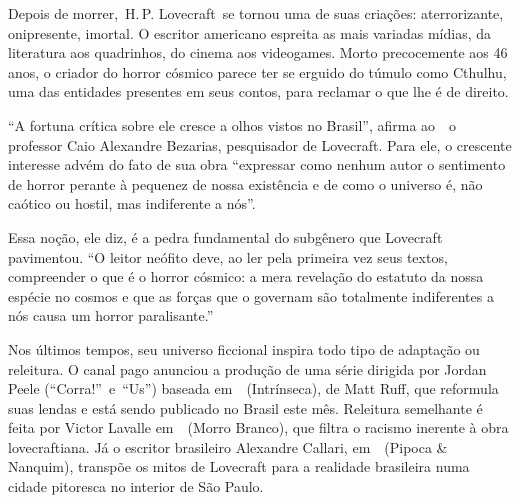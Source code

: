 \begin{changemargin}
\hspace{.5cm}
\vspace*{1cm}
\enlargethispage{-\baselineskip}


\medskip

\hfill{}

\bigskip

Depois de morrer, H.\,P. Lovecraft se tornou uma de suas criações: aterrorizante, onipresente, imortal. O escritor americano espreita as mais variadas mídias, da literatura aos quadrinhos, do cinema aos videogames. Morto precocemente aos 46 anos, o criador do horror cósmico parece ter se erguido do túmulo como Cthulhu, uma das entidades presentes em seus contos, para reclamar o que lhe é de direito.

“A fortuna crítica sobre ele cresce a olhos vistos no Brasil”, afirma ao {} o professor Caio Alexandre Bezarias, pesquisador de Lovecraft. Para ele, o crescente interesse advém do fato de sua obra “expressar como nenhum autor o sentimento de horror perante à pequenez de nossa existência e de como o universo é, não caótico ou hostil, mas indiferente a nós”. 

Essa noção, ele diz, é a pedra fundamental do subgênero que Lovecraft pavimentou. “O leitor neófito deve, ao ler pela primeira vez seus textos, compreender o que é o horror cósmico: a mera revelação do estatuto da nossa espécie no cosmos e que as forças que o governam são totalmente indiferentes a nós causa um horror paralisante.”

Nos últimos tempos, seu universo ficcional inspira todo tipo de adaptação ou releitura. O canal pago  anunciou a produção de uma série dirigida por Jordan Peele (“Corra!” e “Us”) baseada em {} (Intrínseca), de Matt Ruff, que reformula suas lendas e está sendo publicado no Brasil este mês. Releitura semelhante é feita por Victor Lavalle em {} (Morro Branco), que filtra o racismo inerente à obra lovecraftiana. Já o escritor brasileiro Alexandre Callari, em {} (Pipoca \& Nanquim), transpõe os mitos de Lovecraft para a realidade brasileira numa cidade pitoresca no interior de São Paulo. 


\end{changemargin}
